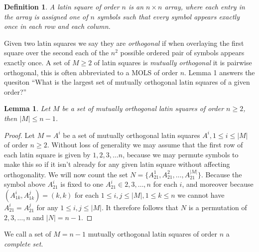 \documentclass{article}
\newtheorem{lemma}{Lemma}
\newtheorem{definition}{Definition}
\begin{document}
\begin{definition}
  A latin square of order \(n\) is an \(n \times n\) array, where each entry in the array is assigned one of \(n\) symbols such that every symbol appears exactly once in each row and each column.
\end{definition}

Given two latin squares we say they are \textit{orthogonal} if when overlaying the first square over the second each of the \(n^2\) possible ordered pair of symbols appears exactly once.
A set of \(M \geq 2\) of latin squares is \textit{mutually orthogonal} it is pairwise orthogonal, this is often abbreviated to a MOLS of order \(n\). Lemma 1 answers the quesiton ``What is the largest set of mutually orthogonal latin squares of a given order?''

\begin{lemma}
  Let \(M\) be a set of mutually orthogonal latin squares of order \(n \geq 2\), then \(|M| \leq n - 1\).
\end{lemma}
\begin{proof}
  Let \(M = {A^i}\) be a set of mutually orthogonal latin squares \(A^i, 1 \leq i \leq |M|\) of order \(n \geq 2\). Without loss of generality we may assume that the first row of each latin square is given by \(1, 2, 3, \ldots n\), because we may permute symbols to make this so if it isn't already for any given latin square without affecting orthogonality.
  We will now count the set \(N = \{A^1_{21}, A^2_{21}, \ldots, A^{|M|}_{21}\}\). Because the symbol above \(A^i_{21}\) is fixed to one \(A^i_{21} \in {2, 3, \ldots, n}\) for each \(i\), and moreover because \((A^i_{1k}, A^j_{1k}) = (k, k)\) for each \(1 \leq i, j \leq |M|, 1 \leq k \leq n\) we cannot have \(A^i_{21} = A^j_{21}\) for any \(1 \leq i, j \leq |M|\).
  It therefore follows that \(N\) is a permutation of \({2, 3, \ldots, n}\) and \(|N| = n - 1\).
\end{proof}

We call a set of \(M = n - 1\) mutually orthogonal latin squares of order \(n\) a \textit{complete set}.
\end{document}
